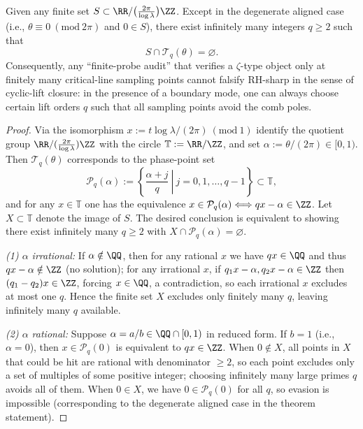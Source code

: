 \begin{theorem}\label{thm:zeta-cyclic-lift-finite-probe-evasion}
Given any finite set
\(
S\subset \RR/\bigl(\tfrac{2\pi}{\log\lambda}\bigr)\ZZ
\).
Except in the degenerate aligned case (i.e., \(\theta\equiv 0\ (\mathrm{mod}\ 2\pi)\) and \(0\in S\)), there exist infinitely many integers \(q\ge 2\) such that
\[
S\cap \mathcal T_q(\theta)=\varnothing.
\]
Consequently, any ``finite-probe audit'' that verifies a \(\zeta\)-type object only at finitely many critical-line sampling points cannot falsify RH-sharp in the sense of cyclic-lift closure: in the presence of a boundary mode, one can always choose certain lift orders \(q\) such that all sampling points avoid the comb poles.
\end{theorem}
\begin{proof}
Via the isomorphism
\(
x:=t\log\lambda/(2\pi)\ (\mathrm{mod}\ 1)
\)
identify the quotient group \(\RR/(\tfrac{2\pi}{\log\lambda})\ZZ\) with the circle \(\mathbb T:=\RR/\ZZ\), and set \(\alpha:=\theta/(2\pi)\in[0,1)\).
Then \(\mathcal T_q(\theta)\) corresponds to the phase-point set
\[
\mathcal P_q(\alpha):=\left\{\left.\frac{\alpha+j}{q}\ \right|\ j=0,1,\dots,q-1\right\}\subset\mathbb T,
\]
and for any \(x\in\mathbb T\) one has the equivalence
\(
x\in\mathcal P_q(\alpha)\Longleftrightarrow qx-\alpha\in\ZZ
\).
Let \(X\subset\mathbb T\) denote the image of \(S\). The desired conclusion is equivalent to showing there exist infinitely many \(q\ge 2\) with \(X\cap\mathcal P_q(\alpha)=\varnothing\).
\par
\emph{(1) \(\alpha\) irrational:} If \(\alpha\notin\QQ\), then for any rational \(x\) we have \(qx\in\QQ\) and thus \(qx-\alpha\notin\ZZ\) (no solution); for any irrational \(x\), if \(q_1x-\alpha,q_2x-\alpha\in\ZZ\) then \((q_1-q_2)x\in\ZZ\), forcing \(x\in\QQ\), a contradiction, so each irrational \(x\) excludes at most one \(q\).
Hence the finite set \(X\) excludes only finitely many \(q\), leaving infinitely many \(q\) available.
\par
\emph{(2) \(\alpha\) rational:} Suppose \(\alpha=a/b\in\QQ\cap[0,1)\) in reduced form.
If \(b=1\) (i.e., \(\alpha=0\)), then \(x\in\mathcal P_q(0)\) is equivalent to \(qx\in\ZZ\).
When \(0\notin X\), all points in \(X\) that could be hit are rational with denominator \(\ge 2\), so each point excludes only a set of multiples of some positive integer; choosing infinitely many large primes \(q\) avoids all of them.
When \(0\in X\), we have \(0\in\mathcal P_q(0)\) for all \(q\), so evasion is impossible (corresponding to the degenerate aligned case in the theorem statement).

\end{proof}
